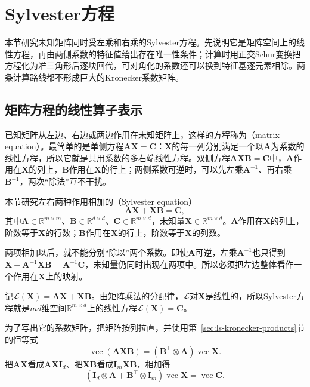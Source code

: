 
\section{Sylvester方程}
\label{sec:ls-matrix-equations}

本节研究未知矩阵同时受左乘和右乘的Sylvester方程。先说明它是矩阵空间上的线性方程，再由两侧系数的特征值给出存在唯一性条件；计算时用正交Schur变换把方程化为准三角形后逐块回代，可对角化的系数还可以换到特征基逐元素相除。两条计算路线都不形成巨大的Kronecker系数矩阵。

\subsection{矩阵方程的线性算子表示}
\label{sec:ls-matrix-equation-types}

已知矩阵从左边、右边或两边作用在未知矩阵上，这样的方程称为（matrix equation）。最简单的是单侧方程$\bm A\bm X=\bm C$：$\bm X$的每一列分别满足一个以$\bm A$为系数的线性方程，所以它就是共用系数的多右端线性方程。双侧方程$\bm A\bm X\bm B=\bm C$中，$\bm A$作用在$\bm X$的列上，$\bm B$作用在$\bm X$的行上；两侧系数可逆时，可以先左乘$\bm A^{-1}$、再右乘$\bm B^{-1}$，两次“除法”互不干扰。

本节研究左右两种作用相加的（Sylvester equation）
\begin{equation}
 \bm A\bm X+\bm X\bm B=\bm C,
 \label{eq:ls-sylvester-equation}
\end{equation}
其中$\bm A\in\mathbb R^{m\times m}$、$\bm B\in\mathbb R^{d\times d}$、$\bm C\in\mathbb R^{m\times d}$，未知量$\bm X\in\mathbb R^{m\times d}$。$\bm A$作用在$\bm X$的列上，阶数等于$\bm X$的行数；$\bm B$作用在$\bm X$的行上，阶数等于$\bm X$的列数。

两项相加以后，就不能分别“除以”两个系数。即使$\bm A$可逆，左乘$\bm A^{-1}$也只得到$\bm X+\bm A^{-1}\bm X\bm B=\bm A^{-1}\bm C$，未知量仍同时出现在两项中。所以必须把左边整体看作一个作用在$\bm X$上的映射。

记$\mathcal L(\bm X)=\bm A\bm X+\bm X\bm B$。由矩阵乘法的分配律，$\mathcal L$对$\bm X$是线性的，所以Sylvester方程就是$md$维空间$\mathbb R^{m\times d}$上的线性方程$\mathcal L(\bm X)=\bm C$。

为了写出它的系数矩阵，把矩阵按列拉直，并使用第~\ref{sec:ls-kronecker-products}节的恒等式
\[
 \operatorname{vec}(\bm A\bm X\bm B)=(\bm B^\top\otimes\bm A)\operatorname{vec}\bm X .
\]
把$\bm A\bm X$看成$\bm A\bm X\bm I_d$、把$\bm X\bm B$看成$\bm I_m\bm X\bm B$，相加得
\begin{equation}
 (\bm I_d\otimes\bm A+\bm B^\top\otimes\bm I_m)\operatorname{vec}\bm X
 =\operatorname{vec}\bm C .
 \label{eq:ls-sylvester-vectorized}
\end{equation}

